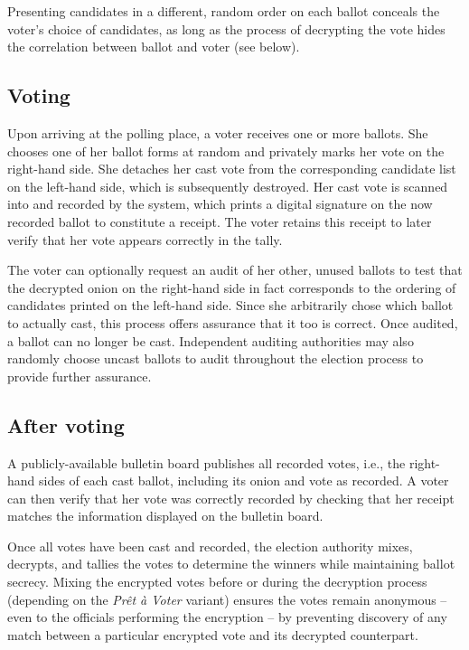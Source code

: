 \documentclass[10pt,twocolumn]{article}
\newcommand{\term}[1]{\textit{#1}}
\newcommand{\preta}{Pr\^{e}t \`{a}}
\newcommand{\pv}{\preta{} Voter}
\begin{document}
Presenting candidates in a different, random order on each ballot conceals the voter's choice of candidates, as long as the process of decrypting the vote hides the correlation between ballot and voter (see below).

\subsection{Voting}

Upon arriving at the polling place, a voter receives one or more ballots.
She chooses one of her ballot forms at random and privately marks her vote on the right-hand side.
She detaches her cast vote from the corresponding candidate list on the left-hand side, which is subsequently destroyed.
Her cast vote is scanned into and recorded by the system, which prints a digital signature on the now recorded ballot to constitute a receipt.
The voter retains this receipt to later verify that her vote appears correctly in the tally.

The voter can optionally request an audit of her other, unused ballots to test that the decrypted onion on the right-hand side in fact corresponds to the ordering of candidates printed on the left-hand side.
Since she arbitrarily chose which ballot to actually cast, this process offers assurance that it too is correct.
Once audited, a ballot can no longer be cast.
Independent auditing authorities may also randomly choose uncast ballots to audit throughout the election process to provide further assurance.

\subsection{After voting}
A publicly-available bulletin board publishes all recorded votes, i.e., the right-hand sides of each cast ballot, including its onion and vote as recorded.
A voter can then verify that her vote was correctly recorded by checking that her receipt matches the information displayed on the bulletin board.

Once all votes have been cast and recorded, the election authority mixes, decrypts, and tallies the votes to determine the winners while maintaining ballot secrecy.
Mixing the encrypted votes before or during the decryption process (depending on the \term{\pv{}} variant) ensures the votes remain anonymous -- even to the officials performing the encryption -- by preventing discovery of any match between a particular encrypted vote and its decrypted counterpart.
\end{document}
